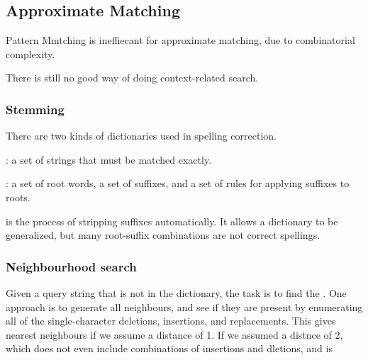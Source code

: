 
\subsection{Approximate Matching}
Pattern Mmtching is ineffiecant for approximate matching, due to combinatorial complexity. 

There is still no good way of doing context-related search.

\subsubsection{Stemming}
There are two kinds of dictionaries used in spelling correction.
\begin{compactitem}
\item {}: a set of strings that must be matched exactly.
\item {}: a set of root words, a set of suffixes, and a set of rules
for applying suffixes to roots.
\end{compactitem}
 is the process of stripping suffixes automatically. It allows a
dictionary to be generalized, but many root-suffix combinations are not
correct spellings.

\subsubsection{Neighbourhood search}
Given a query string that is not in the dictionary, the task is to find the
. One approach is to generate all neighbours, and see if they are present by enumerating all of the single-character deletions, insertions, and
replacements. This gives  nearest neighbours if we assume a distance of 1. If we assumed a distnce of 2,  which does not even include combinations of insertions and dletions, and is 

